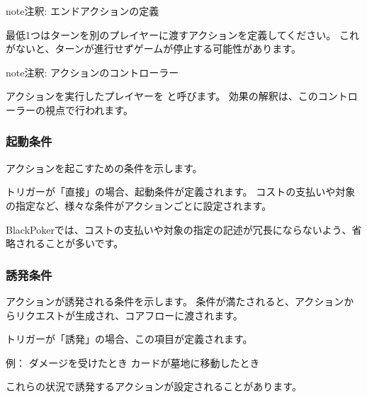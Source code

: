\documentclass[letterpaper,10pt,dvipdfmx]{sphinxmanual}
\begin{document}
\begin{sphinxadmonition}{note}{注釈:}
\sphinxAtStartPar
エンドアクションの定義

\sphinxAtStartPar
最低1つはターンを別のプレイヤーに渡すアクションを定義してください。
これがないと、ターンが進行せずゲームが停止する可能性があります。
\end{sphinxadmonition}

\begin{sphinxadmonition}{note}{注釈:}
\sphinxAtStartPar
アクションのコントローラー

\sphinxAtStartPar
アクションを実行したプレイヤーを  と呼びます。
効果の解釈は、このコントローラーの視点で行われます。
\end{sphinxadmonition}

\ignorespaces 

\subsubsection{起動条件}
\label{\detokenize{core/core:index-13}}\label{\detokenize{core/core:id17}}
\sphinxAtStartPar
アクションを起こすための条件を示します。

\sphinxAtStartPar
トリガーが「直接」の場合、起動条件が定義されます。
コストの支払いや対象の指定など、様々な条件がアクションごとに設定されます。

\sphinxAtStartPar
BlackPokerでは、コストの支払いや対象の指定の記述が冗長にならないよう、省略されることが多いです。

\ignorespaces 

\subsubsection{誘発条件}
\label{\detokenize{core/core:index-14}}\label{\detokenize{core/core:id18}}
\sphinxAtStartPar
アクションが誘発される条件を示します。
条件が満たされると、アクションからリクエストが生成され、コアフローに渡されます。

\sphinxAtStartPar
トリガーが「誘発」の場合、この項目が定義されます。

\sphinxAtStartPar
例：
\sphinxhyphen{} ダメージを受けたとき
\sphinxhyphen{} カードが墓地に移動したとき

\sphinxAtStartPar
これらの状況で誘発するアクションが設定されることがあります。
\end{document}
